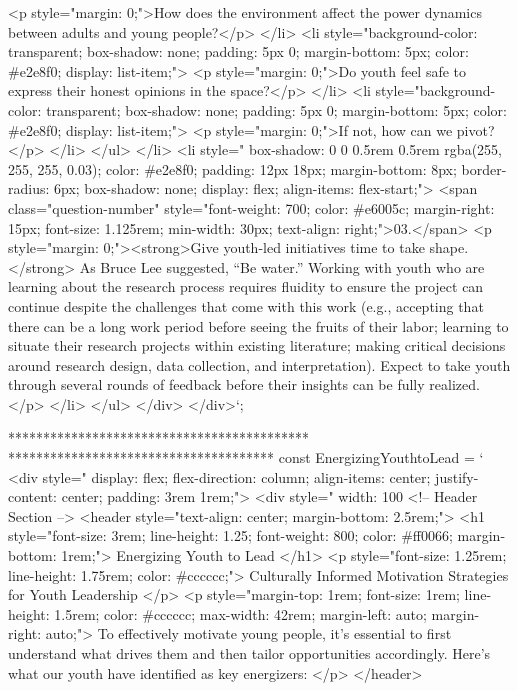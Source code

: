                             <p style="margin: 0;">How does the environment affect the power dynamics between adults and young people?</p>
                        </li>
                        <li style="background-color: transparent; box-shadow: none; padding: 5px 0; margin-bottom: 5px; color: #e2e8f0; display: list-item;">
                            <p style="margin: 0;">Do youth feel safe to express their honest opinions in the space?</p>
                        </li>
                        <li style="background-color: transparent; box-shadow: none; padding: 5px 0; margin-bottom: 5px; color: #e2e8f0; display: list-item;">
                            <p style="margin: 0;">If not, how can we pivot?</p>
                        </li>
                    </ul>
                </li>
                <li style="  box-shadow: 0 0 0.5rem 0.5rem rgba(255, 255, 255, 0.03); color: #e2e8f0; padding: 12px 18px; margin-bottom: 8px; border-radius: 6px; box-shadow: none; display: flex; align-items: flex-start;">
                    <span class="question-number" style="font-weight: 700; color: #e6005c; margin-right: 15px; font-size: 1.125rem; min-width: 30px; text-align: right;">03.</span>
                    <p style="margin: 0;"><strong>Give youth-led initiatives time to take shape.</strong> As Bruce Lee suggested, “Be water.” Working with youth who are learning about the research process requires fluidity to ensure the project can continue despite the challenges that come with this work (e.g., accepting that there can be a long work period before seeing the fruits of their labor; learning to situate their research projects within existing literature; making critical decisions around research design, data collection, and interpretation). Expect to take youth through several rounds of feedback before their insights can be fully realized.</p>
                </li>
            </ul>
        </div>
    </div>`;

    *******************************************
    **************************************
     const EnergizingYouthtoLead = ` <div style="  display: flex; flex-direction: column; align-items: center; justify-content: center; padding: 3rem 1rem;">
        <div style=" width: 100%
            <!-- Header Section -->
            <header style="text-align: center; margin-bottom: 2.5rem;">
                <h1 style="font-size: 3rem; line-height: 1.25; font-weight: 800; color: #ff0066; margin-bottom: 1rem;">
                    Energizing Youth to Lead
                </h1>
                <p style="font-size: 1.25rem; line-height: 1.75rem; color: #cccccc;">
                    Culturally Informed Motivation Strategies for Youth Leadership
                </p>
                <p style="margin-top: 1rem; font-size: 1rem; line-height: 1.5rem; color: #cccccc; max-width: 42rem; margin-left: auto; margin-right: auto;">
                    To effectively motivate young people, it's essential to first understand what drives them and then tailor opportunities accordingly. Here’s what our youth have identified as key energizers:
                </p>
            </header>

